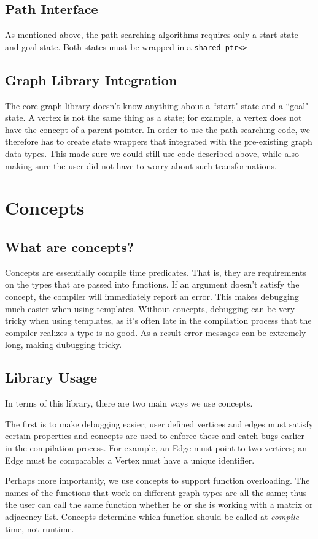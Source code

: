 \documentclass[12pt]{article}
\begin{document}
\subsection{Path Interface}
As mentioned above, the path searching algorithms requires only a start state and goal state. Both states must be wrapped in a \texttt{shared\_ptr<>}

\subsection{Graph Library Integration}
The core graph library doesn't know anything about a ``start" state and a ``goal" state. A vertex is not the same thing as a state; for example, a vertex does not have the concept of a parent pointer. In order to use the path searching code, we therefore has to create state wrappers that integrated with the pre-existing graph data types. This made sure we could still use code described above, while also making sure the user did not have to worry about such transformations.

\section{Concepts}
\subsection{What are concepts?}
Concepts are essentially compile time predicates. That is, they are requirements on the types that are passed into functions. If an argument doesn't satisfy the concept, the compiler will immediately report an error. This makes debugging much easier when using templates. Without concepts, debugging can be very tricky when using templates, as it's often late in the compilation process that the compiler realizes a type is no good. As a result error messages can be extremely long, making dubugging tricky. 
\subsection{Library Usage}
In terms of this library, there are two main ways we use concepts.
\par
The first is to make debugging easier; user defined vertices and edges must satisfy certain properties and concepts are used to enforce these and catch bugs earlier in the compilation process. For example, an Edge must point to two vertices; an Edge must be comparable; a Vertex must have a unique identifier. 
\par
Perhaps more importantly, we use concepts to support function overloading. The names of the functions that work on different graph types are all the same; thus the user can call the same function whether he or she is working with a matrix or adjacency list. Concepts determine which function should be called at \emph{compile} time, not runtime. 
\end{document}
